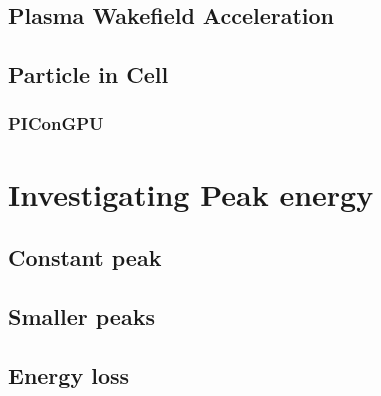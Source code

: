 \section{Plasma Wakefield Acceleration}
\section{Particle in Cell}
\subsection{PIConGPU}



\chapter{Investigating Peak energy}
\section{Constant peak}
\section{Smaller peaks}
\section{Energy loss}

\printbibliography[heading=bibintoc]

\confirmation

